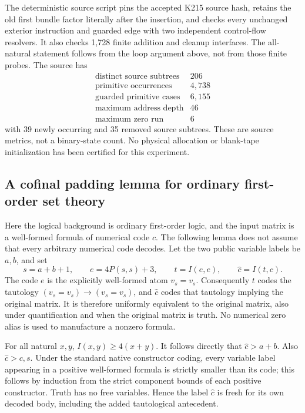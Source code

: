 The deterministic source script pins the accepted K215 source hash,
retains the old first bundle factor literally after the insertion, and
checks every unchanged exterior instruction and guarded edge with two
independent control-flow resolvers. It also checks 1,728 finite addition
and cleanup interfaces. The all-natural statement follows from the loop
argument above, not from those finite probes. The source has
\[
 \begin{array}{c|r}
 \text{distinct source subtrees}&206\\
 \text{primitive occurrences}&4,738\\
 \text{guarded primitive cases}&6,155\\
 \text{maximum address depth}&46\\
 \text{maximum zero run}&6
 \end{array}
\]
with 39 newly occurring and 35 removed source subtrees. These are source
metrics, not a binary-state count. No physical allocation or blank-tape
initialization has been certified for this experiment.

\subsection{A cofinal padding lemma for ordinary first-order set theory}

Here the logical background is ordinary first-order logic, and the input
matrix is a well-formed formula of numerical code \(c\). The following
lemma does not assume that every arbitrary numerical code decodes.
Let the two public variable labels be \(a,b\), and set
\[
 s=a+b+1,\qquad e=4P(s,s)+3,\qquad t=I(e,e),\qquad
                   \widehat c=I(t,c).
\]
The code \(e\) is the explicitly well-formed atom \(v_s=v_s\).
Consequently \(t\) codes the tautology
\((v_s=v_s)\to(v_s=v_s)\), and \(\widehat c\) codes that tautology
implying the original matrix. It is therefore uniformly equivalent to
the original matrix, also under quantification and when the original
matrix is truth. No numerical zero alias is used to manufacture a
nonzero formula.

For all natural \(x,y\), \(I(x,y)\geq4(x+y)\). It follows directly
that \(\widehat c>a+b\). Also \(\widehat c>c,s\). Under the standard
native constructor coding, every variable label appearing in a positive
well-formed formula is strictly smaller than its code; this follows by
induction from the strict component bounds of each positive constructor.
Truth has no free variables. Hence the label \(\widehat c\) is fresh
for its own decoded body, including the added tautological antecedent.

